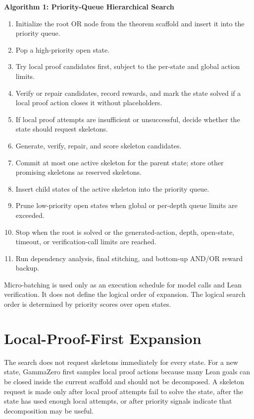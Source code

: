 \noindent\textbf{Algorithm 1: Priority-Queue Hierarchical Search}
\begin{enumerate}[leftmargin=*]
    \item Initialize the root OR node from the theorem scaffold and insert it into the priority queue.
    \item Pop a high-priority open state.
    \item Try local proof candidates first, subject to the per-state and global action limits.
    \item Verify or repair candidates, record rewards, and mark the state solved if a local proof action closes it without placeholders.
    \item If local proof attempts are insufficient or unsuccessful, decide whether the state should request skeletons.
    \item Generate, verify, repair, and score skeleton candidates.
    \item Commit at most one active skeleton for the parent state; store other promising skeletons as reserved skeletons.
    \item Insert child states of the active skeleton into the priority queue.
    \item Prune low-priority open states when global or per-depth queue limits are exceeded.
    \item Stop when the root is solved or the generated-action, depth, open-state, timeout, or verification-call limits are reached.
    \item Run dependency analysis, final stitching, and bottom-up AND/OR reward backup.
\end{enumerate}

Micro-batching is used only as an execution schedule for model calls and Lean verification. It does not define the logical order of expansion. The logical search order is determined by priority scores over open states.

\section{Local-Proof-First Expansion}

The search does not request skeletons immediately for every state. For a new state, GammaZero first samples local proof actions because many Lean goals can be closed inside the current scaffold and should not be decomposed. A skeleton request is made only after local proof attempts fail to solve the state, after the state has used enough local attempts, or after priority signals indicate that decomposition may be useful.

